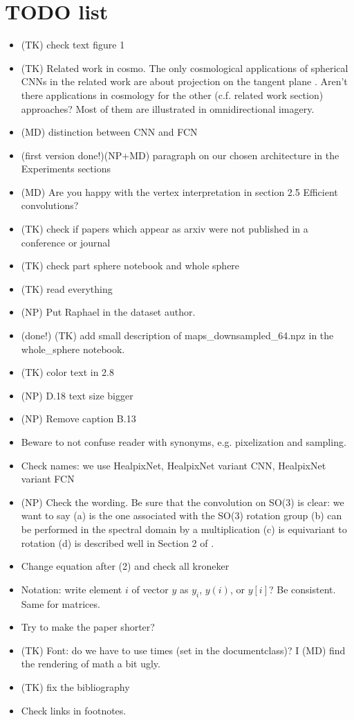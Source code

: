 \documentclass[final,twocolumn,3p,times,authoryear]{elsarticle}
\newcommand{\nati}[1]{{\color[rgb]{.1,.6,.1}{#1}}}
\newcommand{\1}{\b{1}}              %
\newcommand{\0}{\b{0}}              %
\begin{document}
\section*{TODO list}
\begin{itemize}[noitemsep,topsep=0pt,parsep=0pt,partopsep=0pt]
    \item (TK) check text figure 1
	\item (TK) Related work in cosmo. The only cosmological applications of spherical CNNs in the related work are about projection on the tangent plane \citep{schmelze2017cosmologicalmodel, fluri2018deep, gupta2018nongaussianinformation}. Aren't there applications in cosmology for the other (c.f. related work section) approaches? Most of them are illustrated in omnidirectional imagery.
	\item (MD) distinction between CNN and FCN
    \item (first version done!)(NP+MD) paragraph on our chosen architecture in the Experiments sections
    \item (MD) Are you happy with the vertex interpretation in section 2.5 Efficient convolutions?
    \item (TK) check if papers which appear as arxiv were not published in a conference or journal
    \item (TK) check part sphere notebook and whole sphere
    \item (TK) read everything
    \item (NP) Put Raphael in the dataset author. 
    \item (done!) (TK) add small description of maps\_downsampled\_64.npz in the whole\_sphere notebook. \nati{We need to talk about that.}
    \item (TK) color text in 2.8
    \item (NP) D.18 text size bigger
    \item (NP) Remove caption B.13
	\item Beware to not confuse reader with synonyms, e.g. pixelization and sampling.
    \item Check names: we use HealpixNet, HealpixNet variant CNN, HealpixNet variant FCN
    \item (NP) Check the wording. Be sure that the convolution on SO(3) is clear: we want to say (a) is the one associated with the SO(3) rotation group (b) can be performed  in the spectral domain by a multiplication (c) is equivariant to rotation (d) is described well in Section 2 of \citep{kondor2018clebsch}.
    \item Change equation after (2) and check all kroneker
	\item Notation: write element $i$ of vector $y$ as $y_i$, $y(i)$, or $y[i]$? Be consistent. Same for matrices.
	\item Try to make the paper shorter?
	\item (TK) Font: do we have to use times (set in the documentclass)? I (MD) find the rendering of math a bit ugly.
    \item (TK) fix the bibliography
    \item Check links in footnotes.

\end{itemize}
\end{document}

